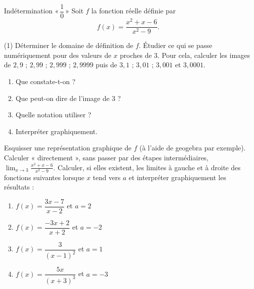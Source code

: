 \documentclass[a4paper,12pt]{article}
\begin{document}
\begin{activite}[label=acti:type10]
	Indétermination $«\,\dfrac{1}{0}\,»$
	\tcblower
Soit $f$ la fonction réelle définie par
\[
f(x)=\frac{x^2+x-6}{x^2-9}.
\]

\begin{tasks}(1)
\task Déterminer le domaine de définition de $f$.
\task Étudier ce qui se passe numériquement pour des valeurs de $x$ proches de $3$. Pour cela, calculer les images de $2{,}9$ ; $2,99$ ; $2,999$ ; $2,9999$ puis de $3,1$ ; $3,01$ ; $3,001$ et $3,0001$.
\begin{multicols}{2}
\begin{enumerate}
\item Que constate-t-on ?
\item Que peut-on dire de l’image de 3 ?
\item Quelle notation utiliser ?
\item Interpréter graphiquement.
\end{enumerate}
\end{multicols}
\task Esquisser une représentation graphique de $f$ (à l’aide de geogebra par exemple).
\task Calculer « directement », sans passer par des étapes intermédiaires, $\displaystyle\lim_{x\to 3}\frac{x^2+x-6}{x^2-9}$.
\task Calculer, si elles existent, les limites à gauche et à droite des fonctions suivantes lorsque $x$ tend vers $a$ et interpréter graphiquement les résultats :
\begin{multicols}{2}
\begin{enumerate}
\item $f(x)=\dfrac{3x-7}{x-2}$ et $a=2$
\item $f(x)=\dfrac{-3x+2}{x+2}$ et $a=-2$
\item $f(x)=\dfrac{3}{(x-1)^2}$ et $a=1$
\item $f(x)=\dfrac{5x}{(x+3)^3}$ et $a=-3$
\end{enumerate}
\end{multicols}
\end{tasks}
\end{activite}
\end{document}
